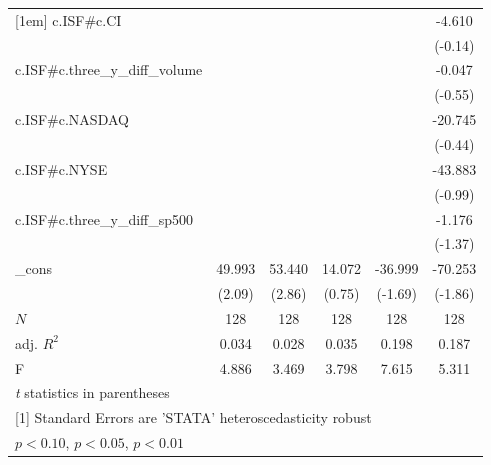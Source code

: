 \begin{table}[htbp]
\begin{tabular}{l*{5}{c}}
[1em]
c.ISF#c.CI  &                     &                     &                     &                     &      -4.610         \\
            &                     &                     &                     &                     &     (-0.14)         \\
[1em]
c.ISF#c.three\_y\_diff\_volume&                     &                     &                     &                     &      -0.047         \\
            &                     &                     &                     &                     &     (-0.55)         \\
[1em]
c.ISF#c.NASDAQ&                     &                     &                     &                     &     -20.745         \\
            &                     &                     &                     &                     &     (-0.44)         \\
[1em]
c.ISF#c.NYSE&                     &                     &                     &                     &     -43.883         \\
            &                     &                     &                     &                     &     (-0.99)         \\
[1em]
c.ISF#c.three\_y\_diff\_sp500&                     &                     &                     &                     &      -1.176         \\
            &                     &                     &                     &                     &     (-1.37)         \\
[1em]
\_cons      &      49.993\sym{**} &      53.440\sym{***}&      14.072         &     -36.999\sym{*}  &     -70.253\sym{*}  \\
            &      (2.09)         &      (2.86)         &      (0.75)         &     (-1.69)         &     (-1.86)         \\
\hline
\(N\)       &         128         &         128         &         128         &         128         &         128         \\
adj. \(R^{2}\)&       0.034         &       0.028         &       0.035         &       0.198         &       0.187         \\
F           &       4.886         &       3.469         &       3.798         &       7.615         &       5.311         \\
\hline\hline
\multicolumn{6}{l}{\footnotesize \textit{t} statistics in parentheses}\\
\multicolumn{6}{l}{\footnotesize [1] Standard Errors are 'STATA' heteroscedasticity robust}\\
\multicolumn{6}{l}{\footnotesize \sym{*} \(p<0.10\), \sym{**} \(p<0.05\), \sym{***} \(p<0.01\)}\\
\end{tabular}
\end{table}
